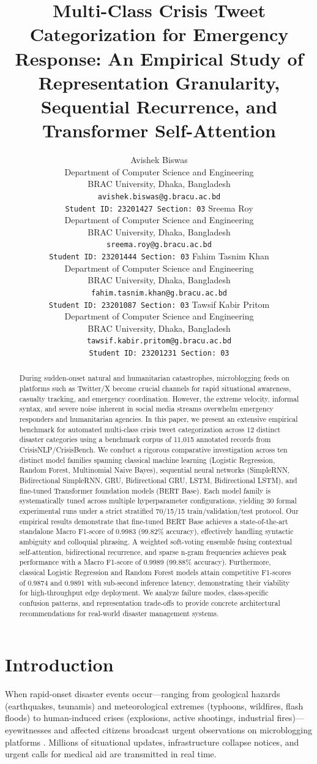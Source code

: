 \documentclass[11pt,a4paper]{article}
\title{Multi-Class Crisis Tweet Categorization for Emergency Response: An Empirical Study of Representation Granularity, Sequential Recurrence, and Transformer Self-Attention}
\author{
  Avishek Biswas \\
  Department of Computer Science and Engineering \\
  BRAC University, Dhaka, Bangladesh \\
  \texttt{avishek.biswas@g.bracu.ac.bd} \\
  \texttt{Student ID: 23201427 \quad Section: 03}
  \And
  Sreema Roy \\
  Department of Computer Science and Engineering \\
  BRAC University, Dhaka, Bangladesh \\
  \texttt{sreema.roy@g.bracu.ac.bd} \\
  \texttt{Student ID: 23201444 \quad Section: 03}
  \AND
  Fahim Tasnim Khan \\
  Department of Computer Science and Engineering \\
  BRAC University, Dhaka, Bangladesh \\
  \texttt{fahim.tasnim.khan@g.bracu.ac.bd} \\
  \texttt{Student ID: 23201087 \quad Section: 03}
  \And
  Tawsif Kabir Pritom \\
  Department of Computer Science and Engineering \\
  BRAC University, Dhaka, Bangladesh \\
  \texttt{tawsif.kabir.pritom@g.bracu.ac.bd} \\
  \texttt{Student ID: 23201231 \quad Section: 03}
}
\date{}
\begin{document}
\maketitle

\begin{abstract}
During sudden-onset natural and humanitarian catastrophes, microblogging feeds on platforms such as Twitter/X become crucial channels for rapid situational awareness, casualty tracking, and emergency coordination. However, the extreme velocity, informal syntax, and severe noise inherent in social media streams overwhelm emergency responders and humanitarian agencies. In this paper, we present an extensive empirical benchmark for automated multi-class crisis tweet categorization across 12 distinct disaster categories using a benchmark corpus of 11,015 annotated records from CrisisNLP/CrisisBench. We conduct a rigorous comparative investigation across ten distinct model families spanning classical machine learning (Logistic Regression, Random Forest, Multinomial Naive Bayes), sequential neural networks (SimpleRNN, Bidirectional SimpleRNN, GRU, Bidirectional GRU, LSTM, Bidirectional LSTM), and fine-tuned Transformer foundation models (BERT Base). Each model family is systematically tuned across multiple hyperparameter configurations, yielding 30 formal experimental runs under a strict stratified 70/15/15 train/validation/test protocol. Our empirical results demonstrate that fine-tuned BERT Base achieves a state-of-the-art standalone Macro F1-score of 0.9983 (99.82\% accuracy), effectively handling syntactic ambiguity and colloquial phrasing. A weighted soft-voting ensemble fusing contextual self-attention, bidirectional recurrence, and sparse n-gram frequencies achieves peak performance with a Macro F1-score of 0.9989 (99.88\% accuracy). Furthermore, classical Logistic Regression and Random Forest models attain competitive F1-scores of 0.9874 and 0.9891 with sub-second inference latency, demonstrating their viability for high-throughput edge deployment. We analyze failure modes, class-specific confusion patterns, and representation trade-offs to provide concrete architectural recommendations for real-world disaster management systems.
\end{abstract}

\section{Introduction}
\label{sec:intro}

When rapid-onset disaster events occur—ranging from geological hazards (earthquakes, tsunamis) and meteorological extremes (typhoons, wildfires, flash floods) to human-induced crises (explosions, active shootings, industrial fires)—eyewitnesses and affected citizens broadcast urgent observations on microblogging platforms \cite{imran2015processing}. Millions of situational updates, infrastructure collapse notices, and urgent calls for medical aid are transmitted in real time. 
\end{document}
